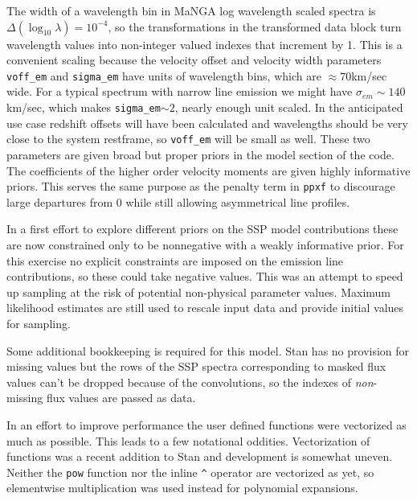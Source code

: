 \documentclass[modern]{aastex62}
\begin{document}
The width of a wavelength bin in MaNGA log wavelength scaled spectra is $\Delta(\log_{10}\lambda) = 10^{-4}$, so the transformations in the transformed data block turn wavelength values into non-integer valued indexes that increment by 1. This is a convenient scaling because the velocity offset and velocity width parameters \texttt{voff\_em} and \texttt{sigma\_em} have units of wavelength bins, which are $\approx 70$km/sec wide. For a typical spectrum with narrow line emission we might have $\sigma_{em} \sim 140$ km/sec, which makes \texttt{sigma\_em}$\sim 2$, nearly enough unit scaled. In the anticipated use case redshift offsets will have been calculated and wavelengths should be very close to the system restframe, so \texttt{voff\_em} will be small as well. These two parameters are given broad but proper priors in the model section of the code. The coefficients of the higher order velocity moments are given highly informative priors. This serves the same purpose as the penalty term in \texttt{ppxf} to discourage large departures from 0 while still allowing asymmetrical line profiles.

In a first effort to explore different priors on the SSP model contributions these are now constrained only to be nonnegative with a weakly informative prior. For this exercise no explicit constraints are imposed on the emission line contributions, so these could take negative values. This was an attempt to speed up sampling at the risk of potential non-physical parameter values. Maximum likelihood estimates are still used to rescale input data and provide initial values for sampling.

Some additional bookkeeping is required for this model. Stan has no provision for missing values but the rows of the SSP spectra corresponding to masked flux values can't be dropped because of the convolutions, so the indexes of \emph{non}-missing flux values are passed as data.

In an effort to improve performance the user defined functions were vectorized as much as possible. This leads to a few notational oddities. Vectorization of functions was a recent addition to Stan and development is somewhat uneven. Neither the \texttt{pow} function nor the inline \texttt{\^} operator are vectorized as yet, so elementwise multiplication was used instead for polynomial expansions.
\end{document}
